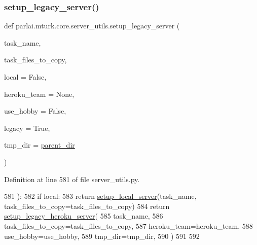 \subsubsection{\texorpdfstring{setup\+\_\+legacy\+\_\+server()}{setup\_legacy\_server()}}
{\footnotesize\ttfamily def parlai.\+mturk.\+core.\+server\+\_\+utils.\+setup\+\_\+legacy\+\_\+server (\begin{DoxyParamCaption}\item[{}]{task\+\_\+name,  }\item[{}]{task\+\_\+files\+\_\+to\+\_\+copy,  }\item[{}]{local = {\ttfamily False},  }\item[{}]{heroku\+\_\+team = {\ttfamily None},  }\item[{}]{use\+\_\+hobby = {\ttfamily False},  }\item[{}]{legacy = {\ttfamily True},  }\item[{}]{tmp\+\_\+dir = {\ttfamily \hyperlink{namespaceparlai_1_1mturk_1_1core_1_1server__utils_a193439bdbc25a32b00f1a43e6f8532d8}{parent\+\_\+dir}} }\end{DoxyParamCaption})}



Definition at line 581 of file server\+\_\+utils.\+py.


\begin{DoxyCode}
581 ):
582     \textcolor{keywordflow}{if} local:
583         \textcolor{keywordflow}{return} \hyperlink{namespaceparlai_1_1mturk_1_1core_1_1server__utils_a9d4c4937ea60bd74630a44739e825ebf}{setup\_local\_server}(task\_name, task\_files\_to\_copy=task\_files\_to\_copy)
584     \textcolor{keywordflow}{return} \hyperlink{namespaceparlai_1_1mturk_1_1core_1_1server__utils_adff2f564896069e0b76ae1b007515a2b}{setup\_legacy\_heroku\_server}(
585         task\_name,
586         task\_files\_to\_copy=task\_files\_to\_copy,
587         heroku\_team=heroku\_team,
588         use\_hobby=use\_hobby,
589         tmp\_dir=tmp\_dir,
590     )
591 
592 
\end{DoxyCode}
\mbox{\label{namespaceparlai_1_1mturk_1_1core_1_1server__utils_a9d4c4937ea60bd74630a44739e825ebf}} 
